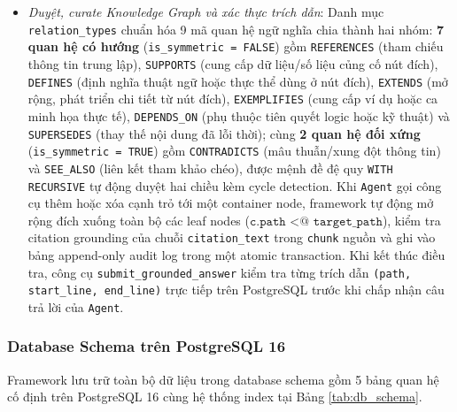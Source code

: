 \begin{enumerate}
\begin{itemize}
        \item \textit{Duyệt, curate Knowledge Graph và xác thực trích dẫn}: Danh mục \texttt{relation\_\allowbreak types} chuẩn hóa 9 mã quan hệ ngữ nghĩa chia thành hai nhóm: \textbf{7 quan hệ có hướng} (\texttt{is\_\allowbreak symmetric = FALSE}) gồm \texttt{REFERENCES} (tham chiếu thông tin trung lập), \texttt{SUPPORTS} (cung cấp dữ liệu/số liệu củng cố nút đích), \texttt{DEFINES} (định nghĩa thuật ngữ hoặc thực thể dùng ở nút đích), \texttt{EXTENDS} (mở rộng, phát triển chi tiết từ nút đích), \texttt{EXEMPLIFIES} (cung cấp ví dụ hoặc ca minh họa thực tế), \texttt{DEPENDS\_ON} (phụ thuộc tiên quyết logic hoặc kỹ thuật) và \texttt{SUPERSEDES} (thay thế nội dung đã lỗi thời); cùng \textbf{2 quan hệ đối xứng} (\texttt{is\_\allowbreak symmetric = TRUE}) gồm \texttt{CONTRADICTS} (mâu thuẫn/xung đột thông tin) và \texttt{SEE\_ALSO} (liên kết tham khảo chéo), được mệnh đề đệ quy \texttt{WITH RECURSIVE} tự động duyệt hai chiều kèm cycle detection. Khi \texttt{Agent} gọi công cụ thêm hoặc xóa cạnh trỏ tới một container node, framework tự động mở rộng đích xuống toàn bộ các leaf nodes ($\texttt{c.path <@ target\_path}$), kiểm tra citation grounding của chuỗi \texttt{citation\_\allowbreak text} trong \texttt{chunk} nguồn và ghi vào bảng append-only audit log trong một atomic transaction. Khi kết thúc điều tra, công cụ \texttt{submit\_\allowbreak grounded\_\allowbreak answer} kiểm tra từng trích dẫn \texttt{(path, \allowbreak start\_line, \allowbreak end\_line)} trực tiếp trên PostgreSQL trước khi chấp nhận câu trả lời của \texttt{Agent}.
    \end{itemize}
\end{enumerate}

\subsubsection{Database Schema trên PostgreSQL 16}
Framework lưu trữ toàn bộ dữ liệu trong database schema gồm 5 bảng quan hệ cố định trên PostgreSQL 16 cùng hệ thống index tại Bảng \ref{tab:db_schema}.

